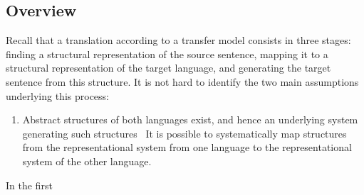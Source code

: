 \documentclass{report}
\theoremstyle{definition}
\theoremstyle{plain}
\begin{document}
\subsection*{Overview}

Recall that a translation according to a transfer model consists in three stages: finding a structural representation of the source sentence, mapping it to a structural representation of the target language, and generating the target sentence from this structure. It is not hard to identify the two main assumptions underlying this process:

\begin{enumerate}
\item Abstract structures of both languages exist, and hence an underlying system generating such structures
\ It is possible to systematically map structures from the representational system from one language to the representational system of the other language.
\end{enumerate}

In the first
\end{document}
